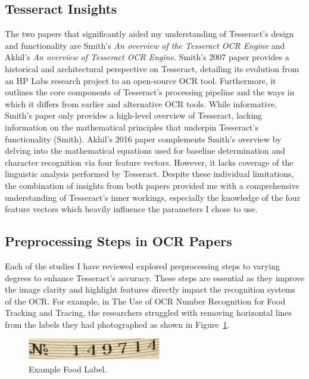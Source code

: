 \documentclass[10pt,twocolumn]{article}
\begin{document}
\subsection{Tesseract Insights}
The two papers that significantly aided my understanding of Tesseract’s design and functionality are Smith’s \textit{An overview of the Tesseract OCR Engine}\cite{Overview_Smith} and Akhil’s \textit{An overview of Tesseract OCR Engine}\cite{Overview_Akhil}. Smith’s 2007 paper provides a historical and architectural perspective on Tesseract, detailing its evolution from an HP Labs research project to an open-source OCR tool. Furthermore, it outlines the core components of Tesseract’s processing pipeline and the ways in which it differs from earlier and  alternative OCR tools. While informative, Smith’s paper only provides a high-level overview of Tesseract, lacking information on the mathematical principles that underpin Tesseract’s functionality (Smith). Akhil’s 2016 paper complements Smith’s overview by delving into the mathematical equations used for baseline determination and character recognition via four feature vectors. However, it lacks coverage of the linguistic analysis performed by Tesseract. Despite these individual limitations, the combination of insights from both papers provided me with a comprehensive understanding of Tesseract’s inner workings, especially the knowledge of the four feature vectors which heavily influence the parameters I chose to use. 


\subsection{Preprocessing Steps in OCR Papers}
Each of the studies I have reviewed explored preprocessing steps to varying degrees to enhance Tesseract’s accuracy. These steps are essential as they improve the image clarity and highlight features directly impact the recognition systems of the OCR. For example, in The Use of OCR Number Recognition for Food Tracking and Tracing, the researchers struggled with removing horizontal lines from the labels they had photographed as shown in Figure~\ref{fig:food}\cite{food}.

\begin{figure}[h!]
    \centering
    \includegraphics[width=\linewidth]{Figures/food_fig.png}
    \caption{Example Food Label.}
    \label{fig:food}
\end{figure}
\end{document}
